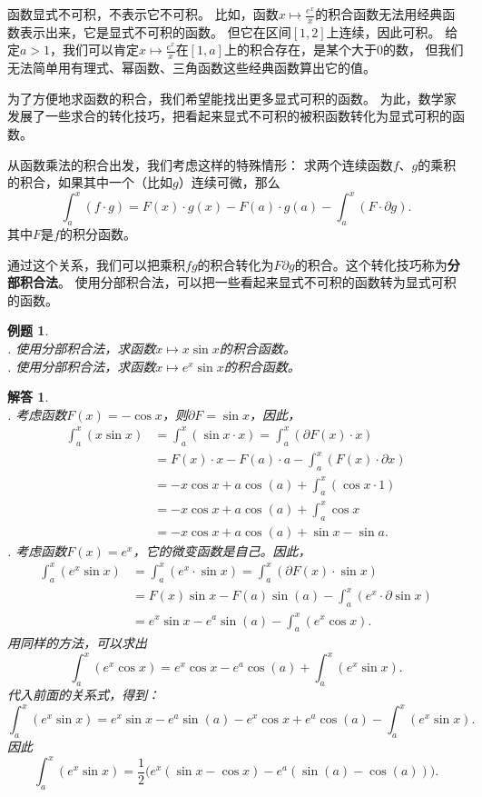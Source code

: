 \documentclass[12pt,UTF8]{ctexbook}
\newtheorem{et}{例题}[section]
\newtheorem*{so}{解答}
\begin{document}
函数显式不可积，不表示它不可积。
比如，函数$x\mapsto \frac{e^x}{x}$的积合函数无法用经典函数表示出来，它是显式不可积的函数。
但它在区间$[1,2]$上连续，因此可积。
给定$a>1$，我们可以肯定$x\mapsto \frac{e^x}{x}$在$[1, a]$上的积合存在，是某个大于$0$的数，
但我们无法简单用有理式、幂函数、三角函数这些经典函数算出它的值。

为了方便地求函数的积合，我们希望能找出更多显式可积的函数。
为此，数学家发展了一些求合的转化技巧，把看起来显式不可积的被积函数转化为显式可积的函数。

从函数乘法的积合出发，我们考虑这样的特殊情形：
求两个连续函数$f$、$g$的乘积的积合，如果其中一个（比如$g$）连续可微，那么
$$ \int_a^x (f \cdot g) = F(x)\cdot g(x) - F(a)\cdot g(a) - \int_a^x (F \cdot \partial g). $$
其中$F$是$f$的积分函数。

通过这个关系，我们可以把乘积$fg$的积合转化为$F\partial g$的积合。这个转化技巧称为\textbf{分部积合法}。
使用分部积合法，可以把一些看起来显式不可积的函数转为显式可积的函数。

\begin{et}
    \mbox{} \\
    . 使用分部积合法，求函数$x\mapsto x \sin{x}$的积合函数。\\
    . 使用分部积合法，求函数$x\mapsto e^x \sin{x}$的积合函数。\\
\end{et}

\begin{so}    
    \mbox{} \\
    . 考虑函数$F(x) = -\cos{x}$，则$\partial F = \sin{x}$，因此，
    \begin{align*}
        \int_a^x (x\sin{x}) &= \int_a^x (\sin{x}\cdot x) = \int_a^x (\partial F(x) \cdot x) \\
        &= F(x)\cdot x - F(a)\cdot a - \int_a^x (F(x) \cdot \partial x) \\
        &= -x\cos{x} + a\cos(a) + \int_a^x (\cos{x} \cdot 1) \\
        &= -x\cos{x} + a\cos(a) + \int_a^x \cos{x} \\
        &= -x\cos{x} + a\cos(a) + \sin{x} - \sin{a}.
    \end{align*}
    . 考虑函数$F(x) = e^x$，它的微变函数是自己。因此，
    \begin{align*}
        \int_a^x \left(e^{x} \sin{x}\right) &= \int_a^x \left(e^x\cdot \sin{x}\right) = \int_a^x \left(\partial F(x) \cdot \sin{x}\right) \\
        &= F(x)\sin{x} - F(a)\sin(a) - \int_a^x \left(e^{x} \cdot \partial \sin{x}\right) \\
        &= e^x\sin{x} - e^a\sin(a) - \int_a^x \left(e^x \cos{x}\right) .
    \end{align*}
    用同样的方法，可以求出
    $$  \int_a^x \left(e^x \cos{x}\right) = e^x\cos{x} - e^a\cos(a) + \int_a^x \left(e^{x} \sin{x}\right). $$
    代入前面的关系式，得到：
    $$ \int_a^x \left(e^{x} \sin{x}\right) = e^x\sin{x} - e^a\sin(a) - e^x\cos{x} + e^a\cos(a) - \int_a^x \left(e^{x} \sin{x}\right). $$
    因此
    $$ \int_a^x \left(e^{x} \sin{x}\right) = \frac{1}{2}\big(e^x(\sin{x} - \cos{x}) - e^a(\sin(a) - \cos(a))\big).$$
\end{so}
\end{document}
